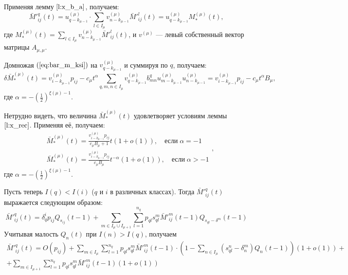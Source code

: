 \documentclass[11pt]{article}
\begin{document}
Применяя лемму $\ref{l:x_b_a}$, получаем:
\begin{equation}
\label{eq:bar_m_star}
    \bar{M}'^q_{ij}(t) = u^{(\mu)}_{q - k_{\mu-1}} \cdot \sum_{l \in I_\mu} v^{(\mu)}_{n - k_{\mu-1}} \bar{M}'^l_{ij}(t) = u^{(\mu)}_{q - k_{\mu-1}} M^{(\mu)}_*(t),
\end{equation}
где $M^{(\mu)}_*(t) = \sum_{l \in I_{\mu}} v^{(\mu)}_{n - k_{\mu-1}} \bar{M}'^l_{ij}(t)$, и $v^{(\mu)}$ --- левый собственный вектор матрицы $A_{\mu,\mu}$.

Домножая $(\ref{eq:bar_m_ksi})$ на $v^{(\mu)}_{q - k_{\mu-1}}$ и суммируя по $q$, получаем:
\begin{equation}
    \delta \bar{M}^{(\mu)}_*(t) = v^{(\mu)}_{i - k_{\mu-1}} p_{ij} - c_{\mu} t^\alpha \sum_{q,m,n \in I_\mu} v^{(\mu)}_{q - k_{\mu-1}} b^q_{mn} u^{(\mu)}_{m - k_{\mu-1}} u^{(\mu)}_{n - k_{\mu-1}} = v^{(\mu)}_{i - k_{\mu-1}} p_{ij} - c_{\mu} t^\alpha B_\mu,
\end{equation}
где $\alpha = -\left( \frac{1}{2} \right)^{\xi(\mu) - 1}$.

Нетрудно видеть, что величина $\bar{M}^{(\mu)}_*(t)$ удовлетворяет условиям леммы $\ref{l:x_rec}$. Применяя её, получаем:
\begin{equation}
\label{eq:bar_m_result_1}
    \begin{split}
        &\bar{M}^{(\mu)}_*(t) = \frac{ v^{(\mu)}_{i - k_{\mu-1}} p_{ij} }{ c_{\mu} B_{\mu} + 1 } t (1 + o(1)),\quad\text{если}\;\alpha = -1 \\
        &\bar{M}^{(\mu)}_*(t) = \frac{ v^{(\mu)}_{i - k_{\mu-1}} p_{ij} }{ c_{\mu} B_{\mu} } t^{-\alpha} (1 + o(1)),\quad\text{если}\;\alpha > -1
    \end{split},
\end{equation}
где $\alpha = -\left( \frac{1}{2} \right)^{\xi(\mu) - 1}$.

Пусть теперь $I(q) < I(i)$ ($q$ и $i$ в различных классах). Тогда $\bar{M}'^q_{ij}(t)$ выражается следующим образом:
\begin{equation}
    \bar{M}'^q_{ij}(t) = \delta^i_q p_{ij} Q_{s_{ij}}(t-1) + \sum_{m \in I_\mu \cup I_{\mu+1}} \sum_{l = 1}^{n_q} p_{ql} s_{ql}^m \bar{M}'^m_{ij}(t-1) Q_{s_{ql} - \delta^m} (t-1)
\end{equation}
Учитывая малость $Q_n(t)$ при $I(n) > I(q)$, получаем
\begin{multline}
    \bar{M}'^q_{ij}(t) = O(p_{ij}) + \sum_{m \in I_\mu} \sum_{l = 1}^{n_q} p_{ql} s_{ql}^m \bar{M}'^m_{ij}(t-1) \cdot \left( 1 - \sum_{n \in I_\mu} (s_{ql}^n - \delta^m_n) Q_n(t-1) \right) (1 + o(1)) + \\
    + \sum_{m \in I_{\mu+1}} \sum_{l = 1}^{n_q} p_{ql} s_{ql}^m \bar{M}'^m_{ij}(t-1) (1 + o(1))
\end{multline}
\end{document}
